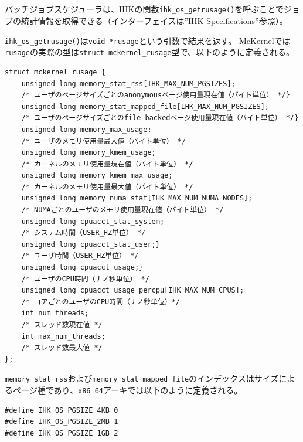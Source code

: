 \documentclass[twoside,11pt,fleqn]{book}
\begin{document}
\subsection{}

\subsection{}
バッチジョブスケジューラは、IHKの関数\texttt{ihk\_os\_getrusage()}を呼ぶことでジョブの統計情報を取得できる（インターフェイスは''IHK Specifications''参照）。

\texttt{ihk\_os\_getrusage()}は\texttt{void *rusage}という引数で結果を返す。
McKernelでは\texttt{rusage}の実際の型は\texttt{struct mckernel\_rusage}型で、以下のように定義される。

\footnotesize
\begin{verbatim}
struct mckernel_rusage {
    unsigned long memory_stat_rss[IHK_MAX_NUM_PGSIZES];
    /* ユーザのぺージサイズごとのanonymousページ使用量現在値（バイト単位） */}
    unsigned long memory_stat_mapped_file[IHK_MAX_NUM_PGSIZES];
    /* ユーザのページサイズごとのfile-backedページ使用量現在値（バイト単位） */}
    unsigned long memory_max_usage;
    /* ユーザのメモリ使用量最大値（バイト単位） */
    unsigned long memory_kmem_usage;
    /* カーネルのメモリ使用量現在値（バイト単位） */
    unsigned long memory_kmem_max_usage;
    /* カーネルのメモリ使用量最大値（バイト単位） */
    unsigned long memory_numa_stat[IHK_MAX_NUM_NUMA_NODES];
    /* NUMAごとのユーザのメモリ使用量現在値（バイト単位） */
    unsigned long cpuacct_stat_system;
    /* システム時間（USER_HZ単位） */
    unsigned long cpuacct_stat_user;}
    /* ユーザ時間（USER_HZ単位） */
    unsigned long cpuacct_usage;}
    /* ユーザのCPU時間（ナノ秒単位） */
    unsigned long cpuacct_usage_percpu[IHK_MAX_NUM_CPUS];
    /* コアごとのユーザのCPU時間（ナノ秒単位）*/
    int num_threads;
    /* スレッド数現在値 */
    int max_num_threads;
    /* スレッド数最大値 */
};
\end{verbatim}
\normalsize

\texttt{memory\_stat\_rss}および\texttt{memory\_stat\_mapped\_file}のインデックスはサイズによるページ種であり、\texttt{x86\_64}アーキでは以下のように定義される。
\begin{verbatim}
#define IHK_OS_PGSIZE_4KB 0
#define IHK_OS_PGSIZE_2MB 1
#define IHK_OS_PGSIZE_1GB 2
\end{verbatim}
\end{document}
